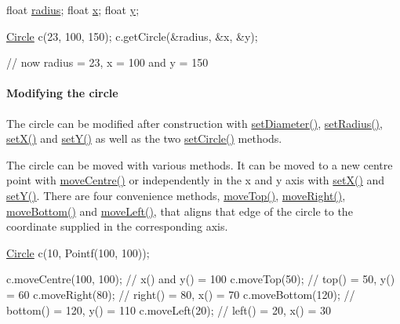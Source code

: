 \begin{DoxyCode}
\textcolor{keywordtype}{float} \hyperlink{classprism_1_1_circle_a75afa2c59f92909d6b6edcec338030fb}{radius};
\textcolor{keywordtype}{float} \hyperlink{classprism_1_1_circle_ae1f729f8fa34605123628e67b230b6be}{x};
\textcolor{keywordtype}{float} \hyperlink{classprism_1_1_circle_a6edc045d912b0d278bd0673af028290e}{y};

\hyperlink{classprism_1_1_circle_aff41793f64e90d15a4d89851b1a6b011}{Circle} c(23, 100, 150);
c.getCircle(&radius, &x, &y);

\textcolor{comment}{// now radius = 23, x = 100 and y = 150}
\end{DoxyCode}


\paragraph*{Modifying the circle}

The circle can be modified after construction with \hyperlink{classprism_1_1_circle_a170c17969d402d01ace2b756c2eec16b}{set\+Diameter()}, \hyperlink{classprism_1_1_circle_ad32152033f280f8c32aebf6791c59fcd}{set\+Radius()}, \hyperlink{classprism_1_1_circle_a9f584b9f7d780975557d6293b18cc051}{set\+X()} and \hyperlink{classprism_1_1_circle_add9bf882d06da81faa8063c9a3fec8ae}{set\+Y()} as well as the two \hyperlink{classprism_1_1_circle_a4d04a2dd0e3a9df5ff6a93e5f67ebcb8}{set\+Circle()} methods.

The circle can be moved with various methods. It can be moved to a new centre point with \hyperlink{classprism_1_1_circle_a1ba209c5aed82199e76427311e4781d2}{move\+Centre()} or independently in the x and y axis with \hyperlink{classprism_1_1_circle_a9f584b9f7d780975557d6293b18cc051}{set\+X()} and \hyperlink{classprism_1_1_circle_add9bf882d06da81faa8063c9a3fec8ae}{set\+Y()}. There are four convenience methods, \hyperlink{classprism_1_1_circle_a6ed1dd2554b297751bb29c22eae26038}{move\+Top()}, \hyperlink{classprism_1_1_circle_ae7d7bbe94f43d61ae8adc764e6cf0e9a}{move\+Right()}, \hyperlink{classprism_1_1_circle_a6392112dd312ec8564596fe00b1e48fa}{move\+Bottom()} and \hyperlink{classprism_1_1_circle_a68a4710fab3752158a149bd9be64f393}{move\+Left()}, that aligns that edge of the circle to the coordinate supplied in the corresponding axis.


\begin{DoxyCode}
\hyperlink{classprism_1_1_circle_aff41793f64e90d15a4d89851b1a6b011}{Circle} c(10, Pointf(100, 100));

c.moveCentre(100, 100); \textcolor{comment}{// x() and y() = 100}
c.moveTop(50);          \textcolor{comment}{// top() = 50, y() = 60}
c.moveRight(80);        \textcolor{comment}{// right() = 80, x() = 70}
c.moveBottom(120);      \textcolor{comment}{// bottom() = 120, y() = 110}
c.moveLeft(20);         \textcolor{comment}{// left() = 20, x() = 30}
\end{DoxyCode}


